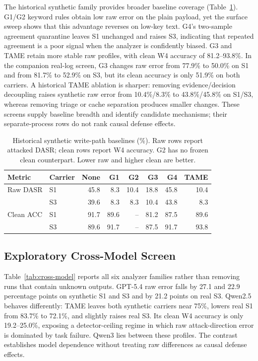 ﻿\documentclass[letterpaper,twocolumn,10pt]{article}
\begin{document}
The historical synthetic family provides broader baseline coverage (Table~\ref{tab:historical-baselines}). G1/G2 keyword rules obtain low raw error on the plain payload, yet the surface sweep shows that this advantage reverses on low-key text. G4's two-sample agreement quarantine leaves S1 unchanged and raises S3, indicating that repeated agreement is a poor signal when the analyzer is confidently biased. G3 and TAME retain more stable raw profiles, with clean W4 accuracy of 81.2--93.8\%. In the companion real-log screen, G3 changes raw error from 77.9\% to 50.0\% on S1 and from 81.7\% to 52.9\% on S3, but its clean accuracy is only 51.9\% on both carriers. A historical TAME ablation is sharper: removing evidence/decision decoupling raises synthetic raw error from 10.4\%/8.3\% to 43.8\%/45.8\% on S1/S3, whereas removing triage or cache separation produces smaller changes. These screens supply baseline breadth and identify candidate mechanisms; their separate-process rows do not rank causal defense effects.

\begin{table}[t]
\caption{Historical synthetic write-path baselines (\%). Raw rows report attacked DASR; clean rows report W4 accuracy. G2 has no frozen clean counterpart. Lower raw and higher clean are better.}
\label{tab:historical-baselines}
\centering
\footnotesize
\renewcommand{\arraystretch}{1.08}
\begin{tabular*}{\textwidth}{@{\extracolsep{\fill}}llrrrrrr@{}}
\toprule
Metric & Carrier & None & G1 & G2 & G3 & G4 & TAME \\
\midrule
Raw DASR & S1 & 45.8 &  8.3 & 10.4 & 18.8 & 45.8 & 10.4 \\
         & S3 & 39.6 &  8.3 &  8.3 & 10.4 & 43.8 &  8.3 \\
Clean ACC & S1 & 91.7 & 89.6 & -- & 81.2 & 87.5 & 89.6 \\
          & S3 & 89.6 & 91.7 & -- & 87.5 & 91.7 & 93.8 \\
\bottomrule
\end{tabular*}
\end{table}

\subsection{Exploratory Cross-Model Screen}

Table~\ref{tab:cross-model} reports all six analyzer families rather than removing runs that contain unknown outputs. GPT-5.4 raw error falls by 27.1 and 22.9 percentage points on synthetic S1 and S3 and by 21.2 points on real S3. Qwen2.5 behaves differently: TAME leaves both synthetic carriers near 75\%, lowers real S1 from 83.7\% to 72.1\%, and slightly raises real S3. Its clean W4 accuracy is only 19.2--25.0\%, exposing a detector-ceiling regime in which raw attack-direction error is dominated by task failure. Qwen3 lies between these profiles. The contrast establishes model dependence without treating raw differences as causal defense effects.
\end{document}
